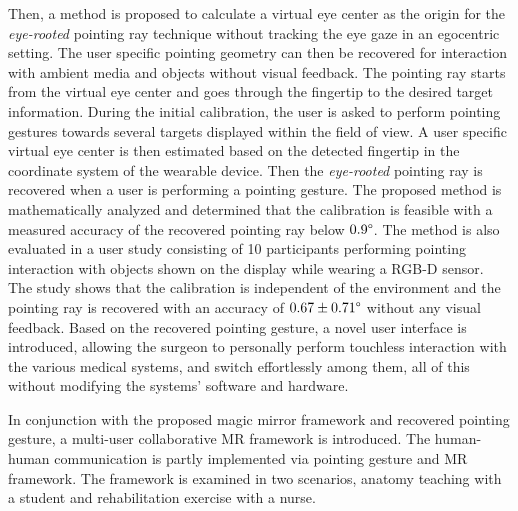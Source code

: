 Then, a method is proposed to calculate a virtual eye center as the origin for the \textit{eye-rooted} pointing ray technique without tracking the eye gaze in an egocentric setting. The user specific pointing geometry can then be recovered for interaction with ambient media and objects without visual feedback. The pointing ray starts from the virtual eye center and goes through the fingertip to the desired target information. During the initial calibration, the user is asked to perform pointing gestures towards several targets displayed within the field of view. A user specific virtual eye center is then estimated based on the detected fingertip in the coordinate system of the wearable device. Then the \textit{eye-rooted} pointing ray is recovered when a user is performing a pointing gesture. 
The proposed method is mathematically analyzed and determined that the calibration is feasible with a measured accuracy of the recovered pointing ray below $0.9\degree$.
The method is also evaluated in a user study consisting of 10 participants performing pointing interaction with objects shown on the display while wearing a RGB-D sensor. The study shows that the calibration is independent of the environment and the pointing ray is recovered with an accuracy of $0.67 \pm 0.71\degree$ without any visual feedback. Based on the recovered pointing gesture, a novel user interface is introduced, allowing the surgeon to {personally} perform touchless interaction with the {various} medical systems, and switch effortlessly among them, all of this {without modifying} the systems' software and hardware.

In conjunction with the proposed magic mirror framework and recovered pointing gesture, a multi-user collaborative MR framework is introduced. The human-human communication is partly implemented via pointing gesture and MR framework. The framework is examined in two scenarios, anatomy teaching with a student and rehabilitation exercise with a nurse.

%
%
